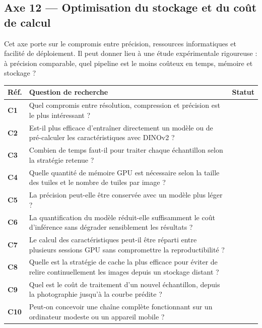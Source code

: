 \documentclass[11pt,a4paper]{article}
\makeatletter
\newenvironment{qtable}{%
  \par\smallskip
  \begin{longtable}{@{}>{\bfseries}p{1.0cm} p{12.3cm} p{1.5cm}@{}}
  \toprule
  \textbf{Réf.} & \textbf{Question de recherche} & \textbf{Statut}\\
  \midrule
  \endhead
}{%
  \bottomrule
  \end{longtable}
}
\makeatother
\begin{document}
\subsection*{Axe 12 --- Optimisation du stockage et du coût de calcul}
Cet axe porte sur le compromis entre précision, ressources informatiques et facilité de déploiement. Il peut donner lieu à une étude expérimentale rigoureuse : à précision comparable, quel pipeline est le moins coûteux en temps, mémoire et stockage ?
\begin{qtable}
C1 & Quel compromis entre résolution, compression et précision est le plus intéressant ? & \\
C2 & Est-il plus efficace d'entraîner directement un modèle ou de pré-calculer les caractéristiques avec DINOv2 ? & \\
C3 & Combien de temps faut-il pour traiter chaque échantillon selon la stratégie retenue ? & \\
C4 & Quelle quantité de mémoire GPU est nécessaire selon la taille des tuiles et le nombre de tuiles par image ? & \\
C5 & La précision peut-elle être conservée avec un modèle plus léger ? & \\
C6 & La quantification du modèle réduit-elle suffisamment le coût d'inférence sans dégrader sensiblement les résultats ? & \\
C7 & Le calcul des caractéristiques peut-il être réparti entre plusieurs sessions GPU sans compromettre la reproductibilité ? & \\
C8 & Quelle est la stratégie de cache la plus efficace pour éviter de relire continuellement les images depuis un stockage distant ? & \\
C9 & Quel est le coût de traitement d'un nouvel échantillon, depuis la photographie jusqu'à la courbe prédite ? & \\
C10 & Peut-on concevoir une chaîne complète fonctionnant sur un ordinateur modeste ou un appareil mobile ? & \\
\end{qtable}
\end{document}
